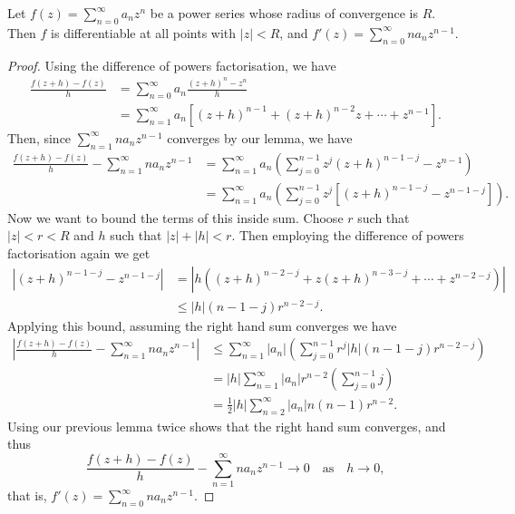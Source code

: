 \begin{theorem}
	Let $f(z) = \sum_{n = 0}^{\infty} a_n z^n$ be a power series whose radius of convergence is $R$. Then $f$ is differentiable at all points with $|z| < R$, and
	$
	f'(z) = \sum_{n = 0}^{\infty} n a_n z^{n - 1}.
	$
\end{theorem}
\begin{proof}
	Using the difference of powers factorisation, we have
	\begin{align*}
		\frac{f(z+h)-f(z)}{h}&=\sum_{n=0}^{\infty} a_{n} \frac{(z+h)^{n}-z^{n}}{h}\\&=\sum_{n=1}^{\infty} a_{n}\left[(z+h)^{n-1}+(z+h)^{n-2} z+\cdots+z^{n-1}\right].
	\end{align*}
	Then, since $\sum_{n = 1}^\infty n a_n z^{n - 1}$ converges by our lemma, we have
	\begin{align*}
		\frac{f(z+h)-f(z)}{h}-\sum_{n=1}^{\infty} n a_{n} z^{n-1} &= \sum_{n = 1}^{\infty} a_n \left(\sum_{j=0}^{n-1} z^{j}(z+h)^{n-1-j}-z^{n-1}\right) \\
		&= \sum_{n = 1}^{\infty} a_n \left(\sum_{j=0}^{n-1} z^{j}\left[(z+h)^{n-1-j}-z^{n-1 - j}\right]\right).
	\end{align*}
	Now we want to bound the terms of this inside sum. Choose $r$ such that $|z| < r < R$ and $h$ such that $|z| + |h| < r$. Then 
	employing the difference of powers factorisation again we get
	\begin{align*}
		|(z+h)^{n-1-j}-z^{n-1 - j}| &= |h((z + h)^{n - 2 - j} + z(z + h)^{n - 3 - j} + \cdots + z^{n - 2 - j})| \\
		&\leq |h|(n- 1 - j)r^{n - 2 - j}.
	\end{align*}
Applying this bound, assuming the right hand sum converges we have
\begin{align*}
	\left|\frac{f(z+h)-f(z)}{h}-\sum_{n=1}^{\infty} n a_{n} z^{n-1}\right| &\leq \sum_{n=1}^{\infty}\left|a_{n}\right|\left(\sum_{j=0}^{n-1} r^{j}|h|(n-1-j) r^{n-2-j}\right) \\
	&= |h| \sum_{n=1}^{\infty}\left|a_{n}\right| r^{n-2}\left(\sum_{j=0}^{n-1}j\right) \\
	&= \frac{1}{2}|h| \sum_{n=2}^{\infty}\left|a_{n}\right| n(n-1)r^{n-2}.
\end{align*}
Using our previous lemma twice shows that the right hand sum converges, and thus
$$
\frac{f(z+h)-f(z)}{h}-\sum_{n=1}^{\infty} n a_{n} z^{n-1} \rightarrow 0 \quad \text{as} \quad h \rightarrow 0,
$$
that is,
$
f'(z) = \sum_{n = 0}^{\infty} n a_n z^{n - 1}.
$
\end{proof}

